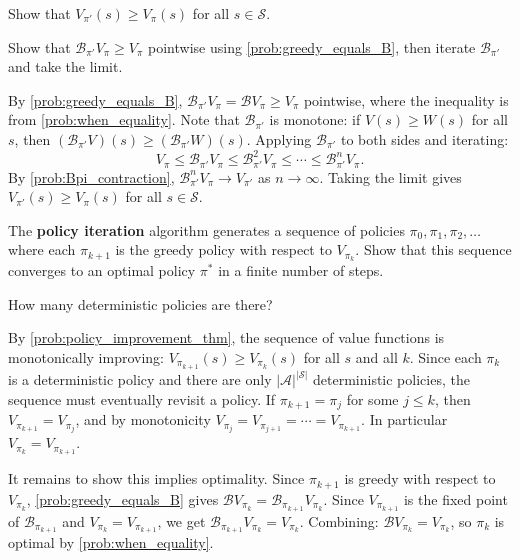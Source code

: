 \documentclass[11pt]{article}
\newcommand{\cS}{\mathcal{S}}
\newcommand{\cA}{\mathcal{A}}
\begin{document}
\begin{exercise}
\label{prob:policy_improvement_thm} Show that $V_{\pi'}(s) \ge V_\pi(s)$ for all $s \in \cS$.

\begin{hint}
Show that $\mathcal{B}_{\pi'} V_\pi \ge V_\pi$ pointwise using \cref{prob:greedy_equals_B}, then iterate $\mathcal{B}_{\pi'}$ and take the limit.
\end{hint}
\end{exercise}

\begin{solution}
By \cref{prob:greedy_equals_B}, $\mathcal{B}_{\pi'} V_\pi = \mathcal{B} V_\pi \ge V_\pi$ pointwise, where the inequality is from \cref{prob:when_equality}. Note that $\mathcal{B}_{\pi'}$ is monotone: if $V(s) \ge W(s)$ for all $s$, then $(\mathcal{B}_{\pi'} V)(s) \ge (\mathcal{B}_{\pi'} W)(s)$. Applying $\mathcal{B}_{\pi'}$ to both sides and iterating:
$$
V_\pi \le \mathcal{B}_{\pi'} V_\pi \le \mathcal{B}_{\pi'}^2 V_\pi \le \cdots \le \mathcal{B}_{\pi'}^n V_\pi.
$$
By \cref{prob:Bpi_contraction}, $\mathcal{B}_{\pi'}^n V_\pi \to V_{\pi'}$ as $n \to \infty$. Taking the limit gives $V_{\pi'}(s) \ge V_\pi(s)$ for all $s \in \cS$.
\end{solution}

\begin{exercise}
\label{prob:policy_iteration} The \textbf{policy iteration} algorithm generates a sequence of policies $\pi_0, \pi_1, \pi_2, \ldots$ where each $\pi_{k+1}$ is the greedy policy with respect to $V_{\pi_k}$. Show that this sequence converges to an optimal policy $\pi^*$ in a finite number of steps.

\begin{hint}
How many deterministic policies are there?
\end{hint}
\end{exercise}

\begin{solution}
By \cref{prob:policy_improvement_thm}, the sequence of value functions is monotonically improving: $V_{\pi_{k+1}}(s) \ge V_{\pi_k}(s)$ for all $s$ and all $k$. Since each $\pi_k$ is a deterministic policy and there are only $|\cA|^{|\cS|}$ deterministic policies, the sequence must eventually revisit a policy. If $\pi_{k+1} = \pi_j$ for some $j \le k$, then $V_{\pi_{k+1}} = V_{\pi_j}$, and by monotonicity $V_{\pi_j} = V_{\pi_{j+1}} = \cdots = V_{\pi_{k+1}}$. In particular $V_{\pi_k} = V_{\pi_{k+1}}$.

It remains to show this implies optimality. Since $\pi_{k+1}$ is greedy with respect to $V_{\pi_k}$, \cref{prob:greedy_equals_B} gives $\mathcal{B} V_{\pi_k} = \mathcal{B}_{\pi_{k+1}} V_{\pi_k}$. Since $V_{\pi_{k+1}}$ is the fixed point of $\mathcal{B}_{\pi_{k+1}}$ and $V_{\pi_k} = V_{\pi_{k+1}}$, we get $\mathcal{B}_{\pi_{k+1}} V_{\pi_k} = V_{\pi_k}$. Combining: $\mathcal{B} V_{\pi_k} = V_{\pi_k}$, so $\pi_k$ is optimal by \cref{prob:when_equality}.
\end{solution}
\end{document}

